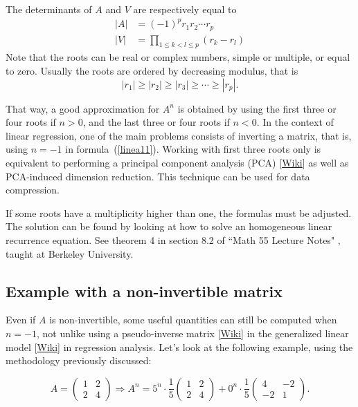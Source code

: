 \documentclass[oneside,10pt]{book}
\begin{document}
The determinants of $A$ and $V$ are respectively equal to
$$
\begin{aligned}
      |A| & = (-1)^p r_1 r_2 \cdots r_p\\
     |V| & = \prod_{1\leq k < l\leq p} (r_k - r_l)
\end{aligned}
$$
Note that the roots can be real or complex numbers, simple or multiple, or equal to zero. Usually the roots are ordered by decreasing modulus, that is
$$
|r_1|\geq |r_2|\geq |r_3| \geq \cdots \geq |r_p|.
$$

\noindent That way, a good approximation for $A^n$ is obtained by using the first three or four roots if $n > 0$, and the last three or four roots if $n < 0$. In the context of linear regression, one of the main problems  consists of inverting a matrix, that is, using $n = -1$ in formula~(\ref{linea11}). Working with first three roots only  is equivalent to performing a 
\textcolor{index}{principal component analysis} (PCA) [\href{https://en.wikipedia.org/wiki/Principal_component_analysis}{Wiki}] as well as PCA-induced dimension reduction.  This technique can be used for data compression.

If some roots have a multiplicity higher than one, the formulas must be adjusted. The solution can be found by looking at how to solve an homogeneous linear recurrence equation. See theorem 4 in section 8.2 of ``Math 55 Lecture Notes" \cite{arashfa}, taught at Berkeley University.

\subsection{Example with a non-invertible matrix}\label{slin1b}

Even if $A$ is non-invertible, some useful quantities can still be computed when $n = -1$, not unlike using a 
\textcolor{index}{pseudo-inverse matrix} [\href{https://en.wikipedia.org/wiki/Moore\%E2\%80\%93Penrose_inverse}{Wiki}]
in the \textcolor{index}{generalized linear model} [\href{https://en.wikipedia.org/wiki/Generalized_linear_model}{Wiki}] in regression analysis. Let's look at the following example, using the methodology previously discussed:

 

\begin{equation*}
A=\left(
\begin{array}{cc}
      1 & 2\\
     2 & 4
\end{array}
\right) \Rightarrow A^n = 5^n \cdot \frac{1}{5}\left(
\begin{array}{cc}
 1 & 2 \\
 2 & 4  
\end{array}
\right)
+ 0^n \cdot \frac{1}{5}
\left(
\begin{array}{rr}
 4 & -2 \\
 -2 &  1
\end{array}
\right).
\end{equation*}
\end{document}
